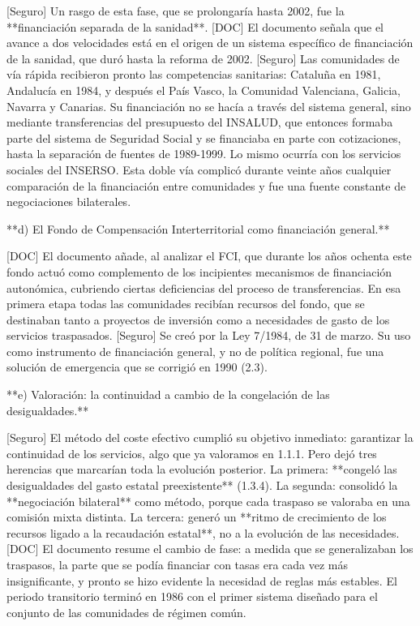 \documentclass[10pt,a4paper]{article}
\begin{document}
[Seguro] Un rasgo de esta fase, que se prolongaría hasta 2002, fue la **financiación separada de la sanidad**. [DOC] El documento señala que el avance a dos velocidades está en el origen de un sistema específico de financiación de la sanidad, que duró hasta la reforma de 2002. [Seguro] Las comunidades de vía rápida recibieron pronto las competencias sanitarias: Cataluña en 1981, Andalucía en 1984, y después el País Vasco, la Comunidad Valenciana, Galicia, Navarra y Canarias. Su financiación no se hacía a través del sistema general, sino mediante transferencias del presupuesto del INSALUD, que entonces formaba parte del sistema de Seguridad Social y se financiaba en parte con cotizaciones, hasta la separación de fuentes de 1989-1999. Lo mismo ocurría con los servicios sociales del INSERSO. Esta doble vía complicó durante veinte años cualquier comparación de la financiación entre comunidades y fue una fuente constante de negociaciones bilaterales.

**d) El Fondo de Compensación Interterritorial como financiación general.**

[DOC] El documento añade, al analizar el FCI, que durante los años ochenta este fondo actuó como complemento de los incipientes mecanismos de financiación autonómica, cubriendo ciertas deficiencias del proceso de transferencias. En esa primera etapa todas las comunidades recibían recursos del fondo, que se destinaban tanto a proyectos de inversión como a necesidades de gasto de los servicios traspasados. [Seguro] Se creó por la Ley 7/1984, de 31 de marzo. Su uso como instrumento de financiación general, y no de política regional, fue una solución de emergencia que se corrigió en 1990 (2.3).

**e) Valoración: la continuidad a cambio de la congelación de las desigualdades.**

[Seguro] El método del coste efectivo cumplió su objetivo inmediato: garantizar la continuidad de los servicios, algo que ya valoramos en 1.1.1. Pero dejó tres herencias que marcarían toda la evolución posterior. La primera: **congeló las desigualdades del gasto estatal preexistente** (1.3.4). La segunda: consolidó la **negociación bilateral** como método, porque cada traspaso se valoraba en una comisión mixta distinta. La tercera: generó un **ritmo de crecimiento de los recursos ligado a la recaudación estatal**, no a la evolución de las necesidades. [DOC] El documento resume el cambio de fase: a medida que se generalizaban los traspasos, la parte que se podía financiar con tasas era cada vez más insignificante, y pronto se hizo evidente la necesidad de reglas más estables. El periodo transitorio terminó en 1986 con el primer sistema diseñado para el conjunto de las comunidades de régimen común.
\end{document}
